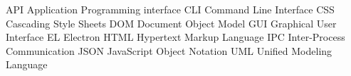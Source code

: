 
   {API}      {Application Programming interface}
    {CLI}       {Command Line Interface}
    {CSS}       {Cascading Style Sheets}
    {DOM}       {Document Object Model}
    {GUI}       {Graphical User Interface}
     {EL}        {Electron}
   {HTML}      {Hypertext Markup Language}
   {IPC}      {Inter-Process Communication}
   {JSON}      {JavaScript Object Notation}
   {UML}      {Unified Modeling Language}